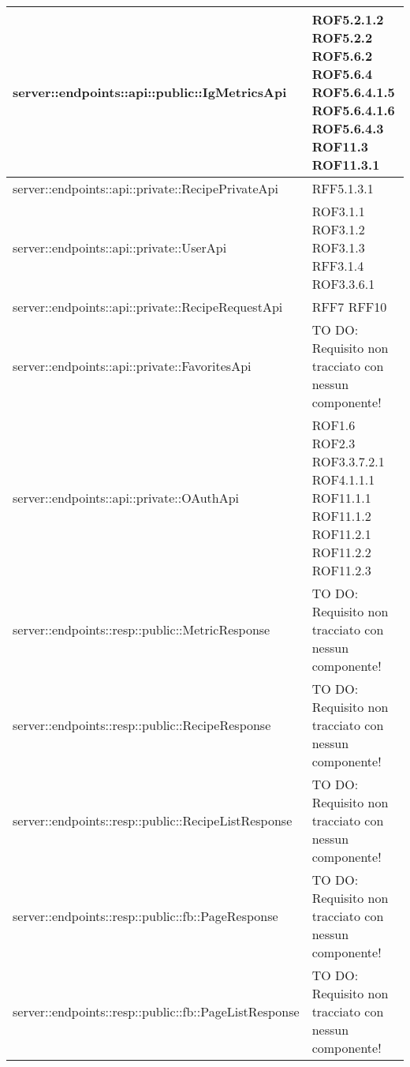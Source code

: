 \begin{center}
\begin{longtable}{| p{11cm} | p{2.5cm} |}
\hline
server::endpoints::api::public::IgMetricsApi & ROF5.2.1.2 \newline ROF5.2.2 \newline ROF5.6.2 \newline ROF5.6.4 \newline ROF5.6.4.1.5 \newline ROF5.6.4.1.6 \newline ROF5.6.4.3 \newline ROF11.3 \newline ROF11.3.1 \\
\hline
server::endpoints::api::private::RecipePrivateApi & RFF5.1.3.1 \\
\hline
server::endpoints::api::private::UserApi & ROF3.1.1 \newline ROF3.1.2 \newline ROF3.1.3 \newline RFF3.1.4 \newline ROF3.3.6.1 \\
\hline
server::endpoints::api::private::RecipeRequestApi & RFF7 \newline RFF10 \\
\hline
server::endpoints::api::private::FavoritesApi & TO DO: Requisito non tracciato con nessun componente! \\
\hline
server::endpoints::api::private::OAuthApi & ROF1.6 \newline ROF2.3 \newline ROF3.3.7.2.1 \newline ROF4.1.1.1 \newline ROF11.1.1 \newline ROF11.1.2 \newline ROF11.2.1 \newline ROF11.2.2 \newline ROF11.2.3 \\
\hline
server::endpoints::resp::public::MetricResponse & TO DO: Requisito non tracciato con nessun componente! \\
\hline
server::endpoints::resp::public::RecipeResponse & TO DO: Requisito non tracciato con nessun componente! \\
\hline
server::endpoints::resp::public::RecipeListResponse & TO DO: Requisito non tracciato con nessun componente! \\
\hline
server::endpoints::resp::public::fb::PageResponse & TO DO: Requisito non tracciato con nessun componente! \\
\hline
server::endpoints::resp::public::fb::PageListResponse & TO DO: Requisito non tracciato con nessun componente! \\

\end{longtable}
\end{center}
